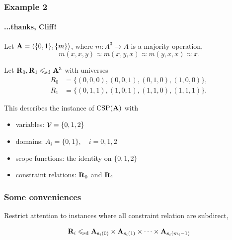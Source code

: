 \documentclass[9pt,xcolor=dvipsnames%
   ]{beamer}
\renewcommand{\alert}[1]{\textcolor{olivegreen}{#1}}
\begin{document}
\begin{frame}
  \frametitle{Example 2}
  \framesubtitle{...thanks, Cliff!}
  
  Let $\mathbf{A} = \langle\{0,1\}, \{m\}\rangle$, where $m: A^3 \to A$ is a majority operation, 
  \[m(x,x,y)\approx m(x,y,x)\approx m(y,x,x) \approx x.\]
  
  Let $\mathbf{R}_0, \mathbf{R}_1 \leqslant_{\mathrm{sd}} \mathbf{A}^3$ with universes
  \begin{align*}
    R_0 &= \{(0,0,0), (0,0,1), (0,1,0), (1,0,0)\},\\
    R_1 &= \{(0,1,1), (1,0,1), (1,1,0), (1,1,1)\}.
  \end{align*}

  This describes the instance of $\operatorname{CSP}(\mathbf{A})$ with
  \begin{itemize}
  \item \alert{variables:} $\mathcal{V} = \{0,1,2\}$
  \item \alert{domains:} $A_i =\{0,1\}, \quad i = 0,1,2$
  \item \alert{scope functions:} the identity on $\{0,1,2\}$
  \item \alert{constraint relations:} $\mathbf{R}_0$ and $\mathbf{R}_1$
  \end{itemize}
\end{frame}
\begin{frame}
  \frametitle{Some conveniences}

  Restrict attention to instances where all constraint relation are
  subdirect,
  
  \[\mathbf{R}_i \leqslant_{\mathrm{sd}} \mathbf{A}_{\mathbf{s}_i(0)} \times \mathbf{A}_{\mathbf{s}_i(1)}\times \cdots \times \mathbf{A}_{\mathbf{s}_i(m_i-1)}\]

  \bigskip

  \bigskip


  \medskip

\end{frame}
\end{document}
